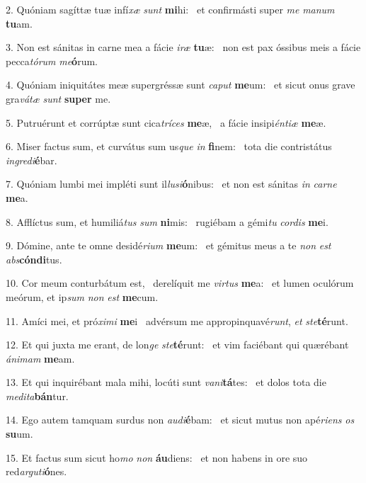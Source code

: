 2. Quóniam sagíttæ tuæ infí\textit{xæ} \textit{sunt} \textbf{mi}hi: \ast\  et confirmásti super \textit{me} \textit{ma}\textit{num} \textbf{tu}am.\

3. Non est sánitas in carne mea a fácie \textit{i}\textit{ræ} \textbf{tu}æ: \ast\  non est pax óssibus meis a fácie pecca\textit{tó}\textit{rum} \textit{me}\textbf{ó}rum.\

4. Quóniam iniquitátes meæ supergréssæ sunt \textit{ca}\textit{put} \textbf{me}um: \ast\  et sicut onus grave gra\textit{vá}\textit{tæ} \textit{sunt} \textbf{su}\textbf{per} me.\

5. Putruérunt et corrúptæ sunt cica\textit{trí}\textit{ces} \textbf{me}æ, \ast\  a fácie insipi\textit{én}\textit{ti}\textit{æ} \textbf{me}æ.\

6. Miser factus sum, et curvátus sum us\textit{que} \textit{in} \textbf{fi}nem: \ast\  tota die contristátus \textit{in}\textit{gre}\textit{di}\textbf{é}bar.\

7. Quóniam lumbi mei impléti sunt il\textit{lu}\textit{si}\textbf{ó}nibus: \ast\  et non est sánitas \textit{in} \textit{car}\textit{ne} \textbf{me}a.\

8. Afflíctus sum, et humiliá\textit{tus} \textit{sum} \textbf{ni}mis: \ast\  rugiébam a gémi\textit{tu} \textit{cor}\textit{dis} \textbf{me}i.\

9. Dómine, ante te omne desidé\textit{ri}\textit{um} \textbf{me}um: \ast\  et gémitus meus a te \textit{non} \textit{est} \textit{abs}\textbf{cón}\textbf{di}tus.\

10. Cor meum conturbátum est, \dag\  derelíquit me \textit{vir}\textit{tus} \textbf{me}a: \ast\  et lumen oculórum meórum, et ip\textit{sum} \textit{non} \textit{est} \textbf{me}cum.\

11. Amíci mei, et pró\textit{xi}\textit{mi} \textbf{me}i \ast\  advérsum me appropinquavé\textit{runt}, \textit{et} \textit{ste}\textbf{té}runt.\

12. Et qui juxta me erant, de lon\textit{ge} \textit{ste}\textbf{té}runt: \ast\  et vim faciébant qui quærébant \textit{á}\textit{ni}\textit{mam} \textbf{me}am.\

13. Et qui inquirébant mala mihi, locúti sunt \textit{va}\textit{ni}\textbf{tá}tes: \ast\  et dolos tota die \textit{me}\textit{di}\textit{ta}\textbf{bán}tur.\

14. Ego autem tamquam surdus non \textit{au}\textit{di}\textbf{é}bam: \ast\  et sicut mutus non apé\textit{ri}\textit{ens} \textit{os} \textbf{su}um.\

15. Et factus sum sicut ho\textit{mo} \textit{non} \textbf{áu}diens: \ast\  et non habens in ore suo red\textit{ar}\textit{gu}\textit{ti}\textbf{ó}nes.\

